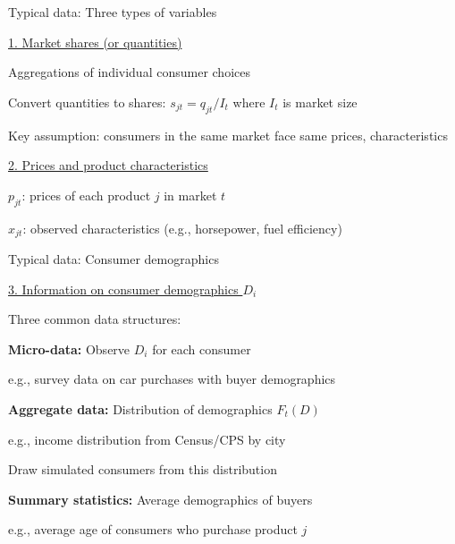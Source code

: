 \documentclass[notes,11pt, aspectratio=169]{beamer}
\newenvironment{wideitemize}{\itemize\addtolength{\itemsep}{10pt}}{\enditemize}
\begin{document}
\begin{frame}{Typical data: Three types of variables}
	\begin{wideitemize}
		\item \underline{1. Market shares (or quantities)}
		\begin{wideitemize}
			\vspace{3pt}
			\item Aggregations of individual consumer choices
			\item Convert quantities to shares: $s_{jt} = q_{jt} / I_t$ where $I_t$ is market size
			\item Key assumption: consumers in the same market face same prices, characteristics
		\end{wideitemize}
		\item \underline{2. Prices and product characteristics}
		\begin{wideitemize}
			\vspace{3pt}
			\item $p_{jt}$: prices of each product $j$ in market $t$
			\item $x_{jt}$: observed characteristics (e.g., horsepower, fuel efficiency)
		\end{wideitemize}
	\end{wideitemize}
\end{frame}

\begin{frame}{Typical data: Consumer demographics}
	\begin{wideitemize}
		\item \underline{3. Information on consumer demographics $D_i$}
		\item Three common data structures:
		\begin{wideitemize}
			\vspace{5pt}
			\item \textbf{Micro-data:} Observe $D_i$ for each consumer
			\begin{wideitemize}
				\item e.g., survey data on car purchases with buyer demographics
			\end{wideitemize}
			\item \textbf{Aggregate data:} Distribution of demographics $F_t(D)$
			\begin{wideitemize}
				\item e.g., income distribution from Census/CPS by city
				\item Draw simulated consumers from this distribution
			\end{wideitemize}
			\item \textbf{Summary statistics:} Average demographics of buyers
			\begin{wideitemize}
				\item e.g., average age of consumers who purchase product $j$
			\end{wideitemize}
		\end{wideitemize}
	\end{wideitemize}
\end{frame}
\end{document}
